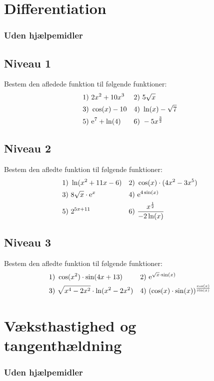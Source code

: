 
\section*{Differentiation}
\subsubsection*{Uden hjælpemidler}
\subsection*{Niveau 1}
Bestem den afledede funktion til følgende funktioner:
\begin{align*}
	&1) \ 2x^2 + 10x^3 &&2) \ 5\sqrt{x} \\
	&3) \ \cos(x)-10 &&4) \ \ln(x)-\sqrt{7} \\
	&5) \ \textnormal{e}^{7}+\ln(4) &&6) \ -5x^{\frac{3}{2}} \\
\end{align*}

\subsection*{Niveau 2}
Bestem den afledte funktion til følgende funktioner:
\begin{align*}
	&1) \ \ln(x^2+11x-6) &&2) \ \cos(x)\cdot(4x^2-3x^5) \\
	&3) \  8\sqrt{x}\cdot \textnormal{e}^{x} &&4) \ \textnormal{e}^{4\sin(x)}\\
	&5) \ 2^{5x+11} &&6) \ \frac{x^{\frac{1}{2}}}{-2\ln(x)} \\
\end{align*}

\subsection*{Niveau 3}
Bestem den afledte funktion til følgende funktioner:
\begin{align*}
	&1) \ \cos(x^2)\cdot \sin(4x+13) &&2) \ \textnormal{e}^{\sqrt{x}\cdot \sin(x)} \\
	&3) \ \sqrt{x^4-2x^2}\cdot \ln(x^2-2x^2) &&4) \ (\cos(x)\cdot \sin(x))^{\frac{\cos(x)}{\sin(x)}}
\end{align*}

\newpage

\section*{Væksthastighed og tangenthældning}
\subsubsection*{Uden hjælpemidler}
